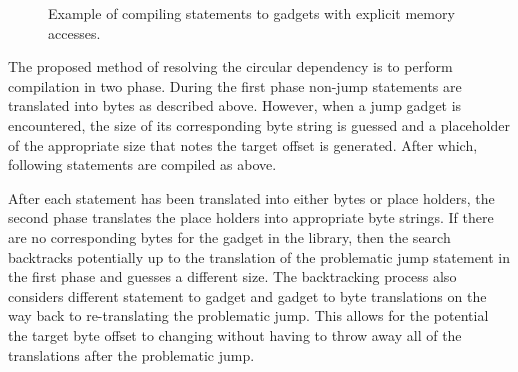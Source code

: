     \begin{figure}
        \centering
        \caption{Example of compiling statements to gadgets with explicit memory
        accesses.}
        \label{fig:method-direct-to-gadget}
    \end{figure}

    The proposed method of resolving the circular dependency is to perform
    compilation in two phase. During the first phase non-jump statements are
    translated into bytes as described above. However, when a jump gadget is
    encountered, the size of its corresponding byte string is guessed and a
    placeholder of the appropriate size that notes the target offset is
    generated. After which, following statements are compiled as above.

    After each statement has been translated into either bytes or place holders,
    the second phase translates the place holders into appropriate byte strings.
    If there are no corresponding bytes for the gadget in the library, then the
    search backtracks potentially up to the translation of the problematic jump
    statement in the first phase and guesses a different size. The backtracking
    process also considers different statement to gadget and gadget to byte
    translations on the way back to re-translating the problematic jump. This
    allows for the potential the target byte offset to changing without having
    to throw away all of the translations after the problematic jump.


